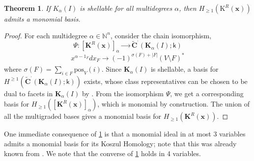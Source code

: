 \documentclass[10pt,reqno]{amsart}
\newtheorem{theorem}[subsection]{Theorem}
\theoremstyle{definition}
\theoremstyle{remark}
\numberwithin{equation}{section}
\newcommand{\kk}{\mathsf k}
\numberwithin{equation}{section}
\begin{document}

 

\begin{theorem}
    \label{shellmonbasis}
     If $K_\alpha(I)$ is shellable for all multidegrees $\alpha$,  then $H_{\geq 1}(\mathrm{ K}^R(\textbf{x}))$ admits a monomial basis.
\end{theorem}
\begin{proof}
     For each multidegree $\alpha\in \mathbb{N}^n$, consider the chain isomorphism,
     \begin{equation}\label{chain map}
\Psi:[\mathbf K^R(\textbf{x})]_{\alpha}\xrightarrow[]{\;\;\;\;\;\;}\widetilde{\mathbf{C}}^{\cdot}(\mathbf{K}_{\alpha}(I);\kk)
\end{equation}
\[
x^{\alpha-1_F}dx_F\xrightarrow[]{\;\;\;\;\;}(-1)^{\sigma(F)+|F|}(V\setminus F)^*
\]
where $\sigma(F)=\sum_{i\in F}\mathrm{pos}_{V}(i)$. Since $\mathbf{K}_{\alpha}(I)$ is shellable, a basis for $H^{\geq 1}(\widetilde{\mathbf{C}}^{\cdot}(\mathbf{K}_{\alpha}(I);\kk))$ exists, whose class representatives can be chosen to be dual to facets in $\mathbf{K}_{\alpha}(I)$ by \cite[Theorem 4.3]{bjorner1996shellable}. From the isomorphism $\Psi$, we get a corresponding basis for $H_{\geq 1}([\mathbf K^R(\textbf{x})]_{\alpha})$, which is monomial by construction. The union of all the multigraded bases gives a monomial basis for $H_{\ge 1}(\mathbf K^R(\textbf{x})).$
\end{proof}

One immediate consequence of \cref{shellmonbasis} is that a monomial ideal in at most 3 variables admits a monomial basis for its Koszul Homology; note that this was already known from \cite{dao2022monomial}. We note that the converse of \cref{shellmonbasis} holds in 4 variables.
\end{document}
